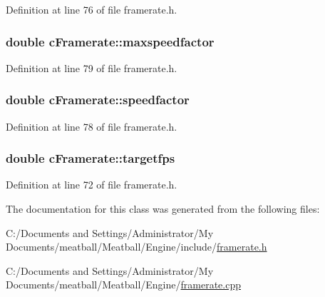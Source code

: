 Definition at line 76 of file framerate.\-h.

\hypertarget{classc_framerate_ad1bca95d162390adcab7352edf2b839c}{
\subsubsection[{maxspeedfactor}]{\setlength{\rightskip}{0pt plus 5cm}double c\-Framerate\-::maxspeedfactor}}\label{classc_framerate_ad1bca95d162390adcab7352edf2b839c}


Definition at line 79 of file framerate.\-h.

\hypertarget{classc_framerate_a5852e9eaeadefcd0da9d0e5c9ec63980}{
\subsubsection[{speedfactor}]{\setlength{\rightskip}{0pt plus 5cm}double c\-Framerate\-::speedfactor}}\label{classc_framerate_a5852e9eaeadefcd0da9d0e5c9ec63980}


Definition at line 78 of file framerate.\-h.

\hypertarget{classc_framerate_af5658ae10ecbaecab7b26251bfc5603b}{
\subsubsection[{targetfps}]{\setlength{\rightskip}{0pt plus 5cm}double c\-Framerate\-::targetfps}}\label{classc_framerate_af5658ae10ecbaecab7b26251bfc5603b}


Definition at line 72 of file framerate.\-h.



The documentation for this class was generated from the following files\-:\begin{DoxyCompactItemize}
\item 
C\-:/\-Documents and Settings/\-Administrator/\-My Documents/meatball/\-Meatball/\-Engine/include/\hyperlink{framerate_8h}{framerate.\-h}\item 
C\-:/\-Documents and Settings/\-Administrator/\-My Documents/meatball/\-Meatball/\-Engine/\hyperlink{framerate_8cpp}{framerate.\-cpp}\end{DoxyCompactItemize}
